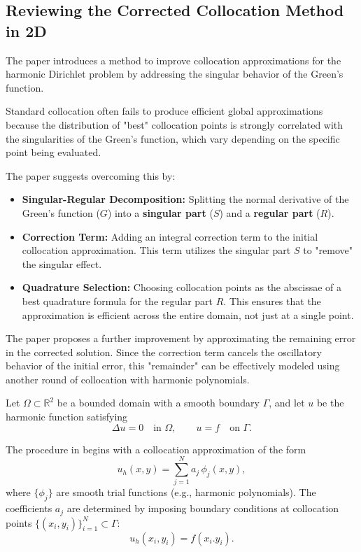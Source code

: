 \documentclass[12pt,oneside,reqno]{amsart}%
\theoremstyle{plain}
\numberwithin{equation}{section}
\begin{document}
\subsection{Reviewing the Corrected Collocation Method in 2D}\hfill

The paper \cite{Levin1980}  introduces a method 
to improve collocation approximations 
for the harmonic Dirichlet problem by addressing 
the singular behavior of the Green's function.

Standard collocation often fails to produce 
efficient global approximations because 
the distribution of "best" collocation points 
is strongly correlated with the singularities 
of the Green's function, which vary depending 
on the specific point being evaluated.

The paper \cite{Levin1980} suggests overcoming this by:
\begin{itemize}
    \item \textbf{Singular-Regular Decomposition:} 
    Splitting the normal derivative of the 
    Green’s function ($G$) into a \textbf{singular part} 
    ($S$) and a \textbf{regular part} ($R$).
    \item \textbf{Correction Term:} 
    Adding an integral correction term to the 
    initial collocation approximation. 
    This term utilizes the singular part $S$ 
    to "remove" the singular effect.
    \item \textbf{Quadrature Selection:} 
    Choosing collocation points as the abscissae 
    of a best quadrature formula
    for the regular part $R$. This ensures that the 
    approximation is efficient across the 
    entire domain, not just at a single point.
\end{itemize}

The paper proposes a further improvement 
by approximating the remaining error in 
the corrected solution. Since the correction 
term cancels the oscillatory behavior of 
the initial error, this "remainder" can be 
effectively modeled using another round of 
collocation with harmonic polynomials.

Let $\Omega \subset \mathbb{R}^2$ be a bounded domain with a smooth boundary 
$\Gamma$, and let $u$ be the harmonic function satisfying
\[
\Delta u = 0 \quad \text{in } \Omega, 
\qquad 
u = f \quad \text{on } \Gamma .
\]

The procedure in \cite{Levin1980} begins with a collocation approximation of the form
\[
u_h(x,y) = \sum_{j=1}^N a_j \, \phi_j(x,y),
\]
where $\{\phi_j\}$ are smooth trial functions (e.g., harmonic polynomials).
The coefficients $a_j$ are determined by imposing boundary conditions at
collocation points $\{(x_i,y_i)\}_{i=1}^N \subset \Gamma$:
\[
u_h(x_i,y_i) = f(x_i.y_i).
\]
  
\end{document}
